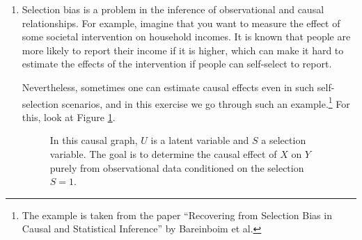 \begin{enumerate}
\begin{ungradedsolution}
\begin{enumerate}
      $$p(R \given \doit(D)) = p(R \given D)$$
      \item Yes.
      \item As $p(R \given D=1) > p(R \given D=0)$, this means that now $p(R \given \doit(D=1)) > p(R \given \doit(D=0))$. So assuming the causal
      structure is as in Figure \ref{fig:Simpson}(ii), the advice for (all) patients is to take the drug.
      \item Left to the imagination of the reader.
      \item $\emptyset$ is sufficient for adjustment according to the back-door criterion, so
      $$p(R \given \doit(D)) = p(R \given D).$$
      \item Yes.
      \item Same as in \ref{Simpson_2}: all patients should take the drug.
    \end{enumerate}
  \end{ungradedsolution}

  \item %
  Selection bias is a problem in the inference of observational and causal relationships.
  For example, imagine that you want to measure the effect of some societal intervention on household incomes.
  It is known that people are more likely to report their income if it is higher, which can make it hard to estimate the effects of the intervention if people can self-select to report.

  Nevertheless, sometimes one can estimate causal effects even in such self-selection scenarios, and in this exercise we go through such an example.\footnote{The example is taken from the paper ``Recovering from Selection Bias in Causal and Statistical Inference'' by Bareinboim et al.}
  For this, look at Figure \ref{fig:selection_effect}.

  \begin{figure}[!ht]
    \centering
    \caption{In this causal graph, $U$ is a latent variable and $S$ a selection variable.
      The goal is to determine the causal effect of $X$ on $Y$ purely from observational data conditioned on the selection $S = 1$.}
    \label{fig:selection_effect}
  \end{figure}


\end{enumerate}
